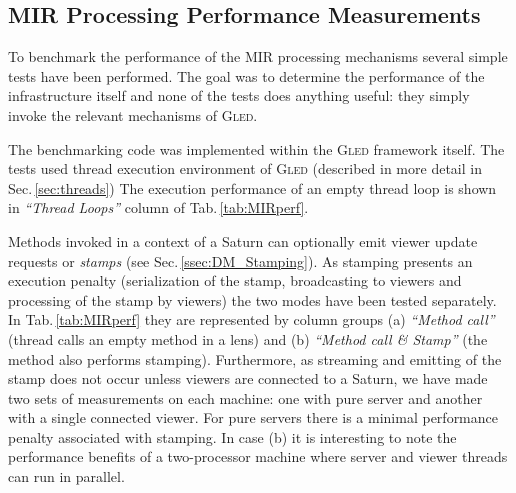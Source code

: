 \documentclass[a4paper,11pt]{article}
\def\gled{\textsc{Gled}\xspace}
\begin{document}
\subsection{MIR Processing Performance Measurements}
\label{ssec:DM_perf}

To benchmark the performance of the MIR processing mechanisms several
simple tests have been performed. The goal was to determine the
performance of the infrastructure itself and none of the tests does
anything useful: they simply invoke the relevant mechanisms of \gled.

The benchmarking code was implemented within the \gled framework
itself. The tests used thread execution environment of \gled
(described in more detail in Sec.\,\ref{sec:threads}) The execution
performance of an empty thread loop is shown in \emph{``Thread Loops''}
column of Tab.\,\ref{tab:MIRperf}.

Methods invoked in a context of a Saturn can optionally emit viewer
update requests or \emph{stamps} (see Sec.\,\ref{ssec:DM_Stamping}). As
stamping presents an execution penalty (serialization of the stamp,
broadcasting to viewers and processing of the stamp by viewers) the
two modes have been tested separately. In Tab.\,\ref{tab:MIRperf} they
are represented by column groups (a) \emph{``Method call''} (thread
calls an empty method in a lens) and (b) \emph{``Method call \&
  Stamp''} (the method also performs stamping). Furthermore, as
streaming and emitting of the stamp does not occur unless viewers are
connected to a Saturn, we have made two sets of measurements on each
machine: one with pure server and another with a single connected
viewer. For pure servers there is a minimal performance penalty
associated with stamping. In case (b) it is interesting to note the
performance benefits of a two-processor machine where server and
viewer threads can run in parallel.
\end{document}
